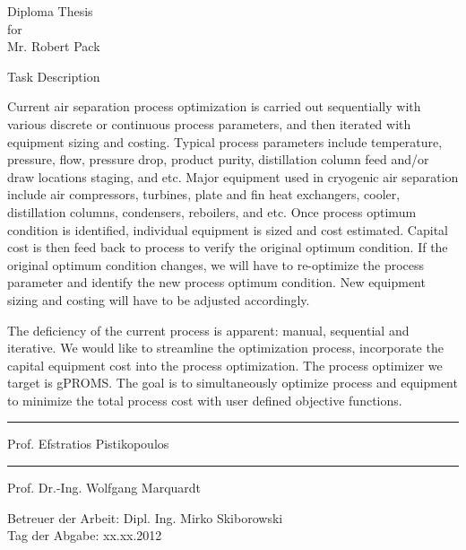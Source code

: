 \thispagestyle{plain} 

\begin{center}
	\LARGE
	Diploma Thesis\\
	for\\
	Mr. Robert Pack\\
	\vspace{4ex}

	\vspace{3ex} Task Description
\end{center}

\normalsize

Current air separation process optimization is carried out sequentially with various discrete or continuous process parameters, 
and then iterated with equipment sizing and costing. Typical process parameters include temperature, pressure, flow, pressure 
drop, product purity, distillation column feed and/or draw locations staging, and etc. Major equipment used in cryogenic air 
separation include air compressors, turbines, plate and fin heat exchangers, cooler, distillation columns, condensers, reboilers, 
and etc. Once process optimum condition is identified, individual equipment is sized and cost estimated. Capital cost is then feed 
back to process to verify the original optimum condition. If the original optimum condition changes, we will have to re-optimize 
the process parameter and identify the new process optimum condition. New equipment sizing and costing will have to be 
adjusted accordingly.

The deficiency of the current process is apparent: manual, sequential and iterative. We would like to streamline the optimization 
process, incorporate the capital equipment cost into the process optimization. The process optimizer we target is gPROMS. The 
goal is to simultaneously optimize process and equipment to minimize the total process cost with user defined objective functions.

 \vfill{
\begin{flushright}
	\begin{minipage}[r]{10cm}
		\begin{center}
			\hrule\vspace*{2ex}Prof. Efstratios Pistikopoulos\\
			\vspace{2cm}
			\hrule\vspace*{2ex}Prof. Dr.-Ing. Wolfgang Marquardt\\
			\vspace{1cm}
		\end{center}
	\end{minipage}
\end{flushright}
}

Betreuer der Arbeit: Dipl. Ing. Mirko Skiborowski\\
Tag der Abgabe: xx.xx.2012
